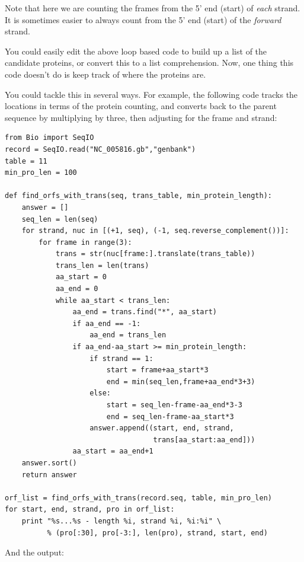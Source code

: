 \documentclass{report}
\begin{document}
Note that here we are counting the frames from the 5' end (start) of
\emph{each} strand. It is sometimes easier to always count from the 5' end
(start) of the \emph{forward} strand.

You could easily edit the above loop based code to build up a list of the
candidate proteins, or convert this to a list comprehension.  Now, one thing
this code doesn't do is keep track of where the proteins are.

You could tackle this in several ways.  For example, the following code tracks
the locations in terms of the protein counting, and converts back to the
parent sequence by multiplying by three, then adjusting for the frame and
strand:

\begin{verbatim}
from Bio import SeqIO 
record = SeqIO.read("NC_005816.gb","genbank")
table = 11
min_pro_len = 100

def find_orfs_with_trans(seq, trans_table, min_protein_length):
    answer = []
    seq_len = len(seq)
    for strand, nuc in [(+1, seq), (-1, seq.reverse_complement())]:
        for frame in range(3):
            trans = str(nuc[frame:].translate(trans_table))
            trans_len = len(trans)
            aa_start = 0
            aa_end = 0
            while aa_start < trans_len:
                aa_end = trans.find("*", aa_start)
                if aa_end == -1:
                    aa_end = trans_len
                if aa_end-aa_start >= min_protein_length:
                    if strand == 1:
                        start = frame+aa_start*3
                        end = min(seq_len,frame+aa_end*3+3)
                    else:
                        start = seq_len-frame-aa_end*3-3
                        end = seq_len-frame-aa_start*3                        
                    answer.append((start, end, strand,
                                   trans[aa_start:aa_end]))
                aa_start = aa_end+1
    answer.sort()
    return answer

orf_list = find_orfs_with_trans(record.seq, table, min_pro_len)
for start, end, strand, pro in orf_list:
    print "%s...%s - length %i, strand %i, %i:%i" \
          % (pro[:30], pro[-3:], len(pro), strand, start, end)
\end{verbatim}

\noindent And the output:
\end{document}
